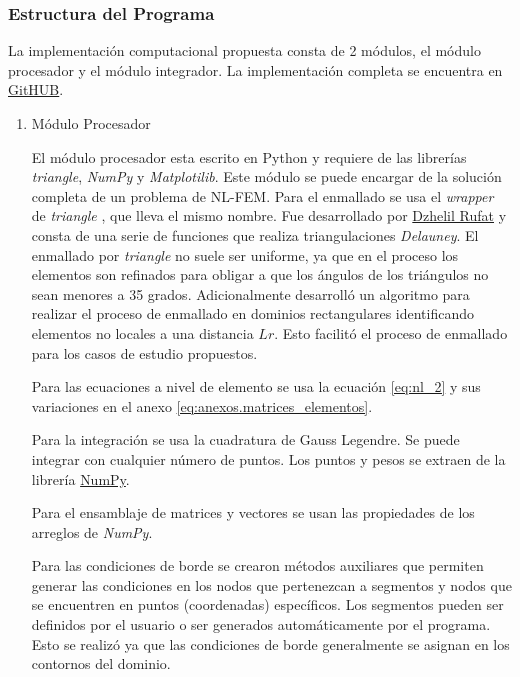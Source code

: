 		\subsubsection{Estructura del Programa}
		La implementación computacional propuesta consta de 2 módulos, el módulo procesador y el módulo integrador. La implementación completa se encuentra en \href{https://github.com/ZibraMax/NLFEM}{GitHUB}. 
			\begin{enumerate}
				\item Módulo Procesador

				El módulo procesador esta escrito en Python y requiere de las librerías \textit{triangle}, \textit{NumPy} y \textit{Matplotilib}. Este módulo se puede encargar de la solución completa de un problema de NL-FEM.
				Para el enmallado se usa el \textit{wrapper} de \textit{triangle} \parencite{triangle}, que lleva el mismo nombre. Fue desarrollado por \href{https://rufat.be/index.html}{Dzhelil Rufat} y consta de una serie de funciones que realiza triangulaciones \textit{Delauney}. El enmallado por \textit{triangle} no suele ser uniforme, ya que en el proceso los elementos son refinados para obligar a que los ángulos de los triángulos no sean menores a 35 grados.
				Adicionalmente \textcite{ProgramaEnmallado} desarrolló un algoritmo para realizar el proceso de enmallado en dominios rectangulares identificando elementos no locales a una distancia $Lr$. Esto facilitó el proceso de enmallado para los casos de estudio propuestos.

				Para las ecuaciones a nivel de elemento se usa la ecuación \ref{eq:nl_2} y sus variaciones en el anexo \ref{eq:anexos.matrices_elementos}.

				Para la integración se usa la cuadratura de Gauss Legendre. Se puede integrar con cualquier número de puntos. Los puntos y pesos se extraen de la librería \href{https://numpy.org/doc/stable/reference/generated/numpy.polynomial.legendre.leggauss.html}{NumPy}.

				Para el ensamblaje de matrices y vectores se usan las propiedades de los arreglos de \textit{NumPy}.

				Para las condiciones de borde se crearon métodos auxiliares que permiten generar las condiciones en los nodos que pertenezcan a segmentos y nodos que se encuentren en puntos (coordenadas) específicos. Los segmentos pueden ser definidos por el usuario o ser generados automáticamente por el programa. Esto se realizó ya que las condiciones de borde generalmente se asignan en los contornos del dominio.
				

\end{enumerate}
